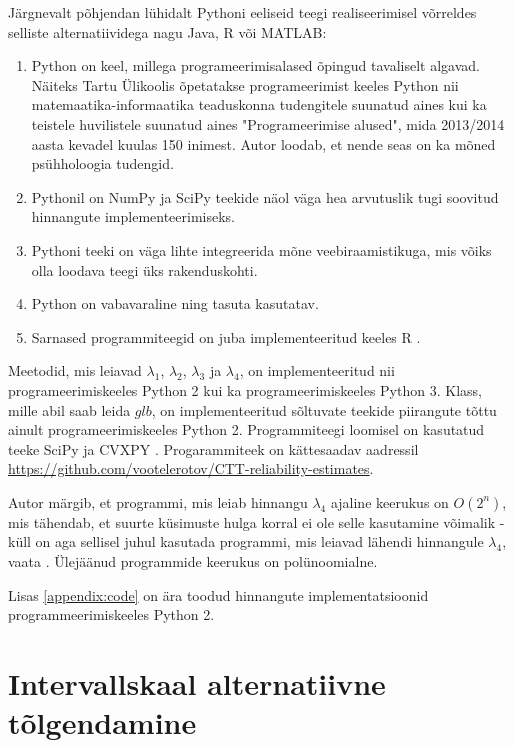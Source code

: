 \documentclass[a4paper,12pt,oneside]{article}
\numberwithin{equation}{section}
\theoremstyle{definition}
\begin{document}
Järgnevalt põhjendan lühidalt Pythoni eeliseid teegi realiseerimisel võrreldes selliste alternatiividega nagu Java, R või MATLAB:
\begin{enumerate}
\item Python on keel, millega programeerimisalased õpingud tavaliselt algavad. Näiteks Tartu Ülikoolis õpetatakse programeerimist keeles Python nii mate\-maatika-informaatika teaduskonna tudengitele suunatud aines kui ka teistele huvilistele suunatud aines "Programeerimise alused", mida 2013/2014 aasta kevadel kuulas 150 inimest. Autor loodab, et nende seas on ka mõned psühholoogia tudengid.
\item Pythonil on NumPy ja SciPy teekide näol väga hea arvutuslik tugi soovitud hinnangute implementeerimiseks.
\item Pythoni teeki on väga lihte integreerida mõne veebiraamistikuga, mis võiks olla loodava teegi üks rakenduskohti.
\item Python on vabavaraline ning tasuta kasutatav.
\item Sarnased programmiteegid on juba implementeeritud  keeles R \cite{Revelle2014}.
\end{enumerate}

Meetodid, mis leiavad $\lambda_1$, $\lambda_2$, $\lambda_3$ ja $\lambda_4$, on implementeeritud nii programeerimiskeeles Python 2 kui ka programeerimiskeeles Python 3. Klass, mille abil saab leida $glb$, on implementeeritud sõltuvate teekide piirangute tõttu ainult programeerimiskeeles Python 2.  Programmiteegi loomisel on kasutatud teeke SciPy \cite{JonesE.;OliphantT;Peterson} ja CVXPY \cite{DiamondS;ChuE;Boyd2014}.
Progarammiteek on kättesaadav aadressil \url{https://github.com/vootelerotov/CTT-reliability-estimates}.

Autor märgib, et programmi, mis leiab hinnangu $\lambda_4$ ajaline keerukus on $O \left( 2^n \right)$, mis tähendab, et suurte küsimuste hulga korral ei ole selle kasutamine võimalik - küll on aga sellisel juhul kasutada programmi, mis leiavad lähendi hinnangule $\lambda_4$, vaata \cite{Benton2013}. Ülejäänud programmide keerukus on polünoomialne. 

Lisas \ref{appendix:code} on ära toodud hinnangute implementatsioonid programmeerimiskeeles Python 2.


\section{Intervallskaal alternatiivne tõlgendamine}
\end{document}
